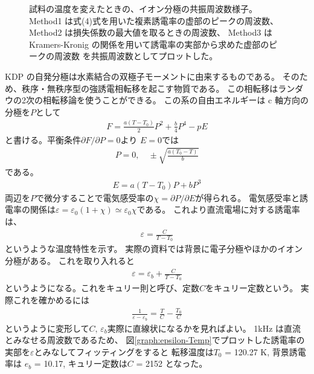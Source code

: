 \documentclass[9pt,dvipdfmx,a4paper]{jsarticle}
\begin{document}
\begin{figure}[t]
\begin{minipage}[t]{0.48\columnwidth}
        \caption{\small{試料の温度を変えたときの、イオン分極の共振周波数様子。
        Method1 は式(4)式を用いた複素誘電率の虚部のピークの周波数、
        Method2 は損失係数の最大値を取るときの周波数、
        Method3 は Kramers-Kronig の関係を用いて誘電率の実部から求めた虚部のピークの周波数
        を共振周波数としてプロットした。}}
        \label{graph:ResF-Temp}
    \end{minipage}
\end{figure}

KDP の自発分極は水素結合の双極子モーメントに由来するものである\cite{onodera}。
そのため、秩序・無秩序型の強誘電相転移を起こす物質である。
この相転移はランダウの2次の相転移論を使うことができる。
この系の自由エネルギーは c 軸方向の分極を\(P\)として
\begin{align}
    F = \frac{a(T-T_0)}{2}P^2 + \frac{b}{4}P^4 -pE
\end{align}
と書ける。平衡条件\(\partial F/\partial P = 0\)より
\(E=0\)では
\begin{align}
    P = 0,\quad \pm\sqrt{\frac{a(T_0-T)}{b}}
\end{align}
である。
\begin{align}
    E = a(T-T_0)P + bP^3
\end{align}
両辺を\(P\)で微分することで電気感受率の\(\chi=\partial P/\partial E\)が得られる。
電気感受率と誘電率の関係は\(\varepsilon = \varepsilon_0(1+\chi)\simeq \varepsilon_0\chi\)である。
これより直流電場に対する誘電率は、
\begin{align}
    \varepsilon = \frac{C}{T-T_0}
\end{align}
というような温度特性を示す。
実際の資料では背景に電子分極やほかのイオン分極がある。
これを取り入れると
\begin{align}
    \varepsilon = \varepsilon_b + \frac{C}{T-T_0}
\end{align}
というようになる。これをキュリー則と呼び、定数\(C\)をキュリー定数という。
実際これを確かめるには
\begin{align}
    \frac{1}{\varepsilon-\varepsilon_b} = \frac{T}{C}-\frac{T_0}{C}
\end{align}
というように変形して\(C,\,\varepsilon_b\)実際に直線状になるかを見ればよい。
1kHz は直流とみなせる周波数であるため、
図\ref{graph:epsilon-Temp}でプロットした誘電率の実部を\(\varepsilon\)とみなしてフィッティングをすると
転移温度は\(T_0\) = 120.27 K, 背景誘電率は \(e_b\) = 10.17, キュリー定数は\(C\) = 2152 となった。
\end{document}
